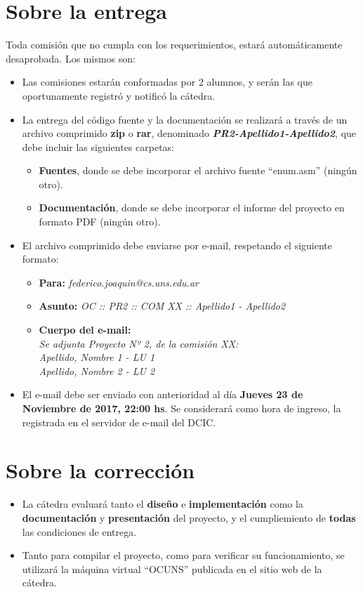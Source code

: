 \documentclass[12pt,a4paper]{article}
\begin{document}
\section*{Sobre la entrega}
Toda comisión que no cumpla con los requerimientos, estará automáticamente desaprobada. Los mismos son:
\begin{itemize}
		
	\item Las comisiones estarán conformadas por 2 alumnos, y serán las que oportunamente registró y notificó la cátedra.
		
	\item La entrega del código fuente y la documentación se realizará a través de un archivo comprimido \textbf{zip} o \textbf{rar}, denominado \textbf{\textit{PR2-Apellido1-Apellido2}}, que debe incluir las siguientes carpetas:
	\begin{itemize}
		\item \textbf{Fuentes}, donde se debe incorporar el archivo fuente “enum.asm” (ningún otro).
		\item \textbf{Documentación}, donde se debe incorporar el informe del proyecto en formato PDF (ningún otro).
	\end{itemize}		
	\item El archivo comprimido debe enviarse por e-mail, respetando el siguiente formato: 
	\begin{itemize}
		\item \textbf{Para:} \textit{federico.joaquin@cs.uns.edu.ar}
		\item \textbf{Asunto:} \textit{OC :: PR2 :: COM XX :: Apellido1 - Apellido2}
		\item \textbf{Cuerpo del e-mail:} \\
		\textit{Se adjunta Proyecto Nº 2, de la comisión XX: } \\
		\textit{Apellido, Nombre 1 - LU 1} \\
		\textit{Apellido, Nombre 2 - LU 2}
	\end{itemize}
	
	\item El e-mail debe ser enviado con anterioridad al día \textbf{Jueves 23 de Noviembre de 2017, 22:00 hs}. Se considerará como hora de ingreso, la registrada en el servidor de e-mail del DCIC.
		
\end{itemize}

\section*{Sobre la corrección}

\begin{itemize}
	
	\item La cátedra evaluará tanto el \textbf{diseño} e \textbf{implementación}
	como la \textbf{documentación} y \textbf{presentación} del proyecto, y el cumpliemiento de \textbf{todas} las condiciones de entrega.
	
	\item Tanto para compilar el proyecto, como para verificar su funcionamiento, se utilizará la máquina virtual “OCUNS” publicada en el sitio web de la cátedra.
	
\end{itemize}
\end{document}
